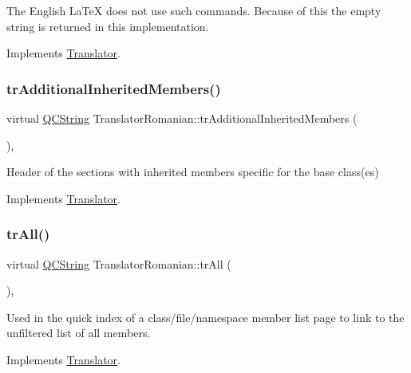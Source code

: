 The English La\+TeX does not use such commands. Because of this the empty string is returned in this implementation. 

Implements \mbox{\hyperlink{class_translator}{Translator}}.

\mbox{\label{class_translator_romanian_a80becfc32a2af84015b012d105a0bf96}} 
\subsubsection{\texorpdfstring{trAdditionalInheritedMembers()}{trAdditionalInheritedMembers()}}
{\footnotesize\ttfamily virtual \mbox{\hyperlink{class_q_c_string}{Q\+C\+String}} Translator\+Romanian\+::tr\+Additional\+Inherited\+Members (\begin{DoxyParamCaption}{ }\end{DoxyParamCaption})\hspace{0.3cm}{\ttfamily [inline]}, {\ttfamily [virtual]}}

Header of the sections with inherited members specific for the base class(es) 

Implements \mbox{\hyperlink{class_translator}{Translator}}.

\mbox{\label{class_translator_romanian_a8389138e725961ad745a2c71dfd76856}} 
\subsubsection{\texorpdfstring{trAll()}{trAll()}}
{\footnotesize\ttfamily virtual \mbox{\hyperlink{class_q_c_string}{Q\+C\+String}} Translator\+Romanian\+::tr\+All (\begin{DoxyParamCaption}{ }\end{DoxyParamCaption})\hspace{0.3cm}{\ttfamily [inline]}, {\ttfamily [virtual]}}

Used in the quick index of a class/file/namespace member list page to link to the unfiltered list of all members. 

Implements \mbox{\hyperlink{class_translator}{Translator}}.

